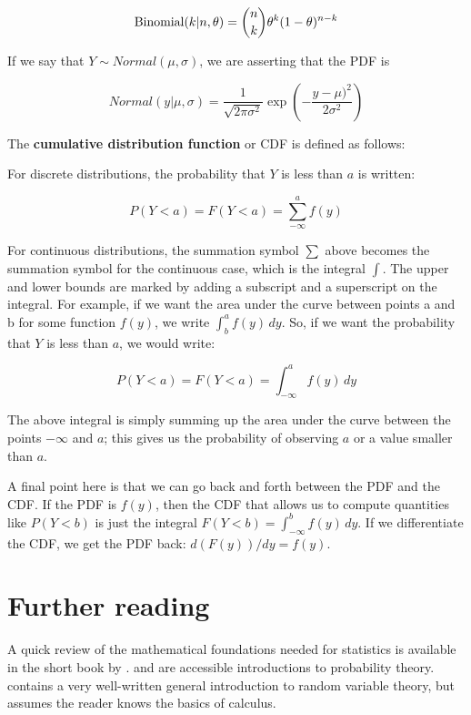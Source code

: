 \documentclass[12pt,]{krantz}
\begin{document}
\begin{equation}
\hbox{Binomial}(k|n,\theta) = 
\binom{n}{k} \theta^{k} (1-\theta)^{n-k}
\end{equation}

If we say that \(Y\sim Normal(\mu,\sigma)\), we are asserting that the PDF is

\begin{equation}
Normal(y|\mu,\sigma)= \frac{1}{\sqrt{2\pi \sigma^2}} \exp \left(-\frac{y-\mu)^2}{2\sigma^2} \right)
\end{equation}

The \textbf{cumulative distribution function} or CDF is defined as follows:

For discrete distributions, the probability that \(Y\) is less than \(a\) is written:

\begin{equation}
P(Y<a) = F(Y<a) =\sum_{-\infty}^{a} f(y)
\end{equation}

For continuous distributions, the summation symbol \(\sum\) above becomes the summation symbol for the continuous case, which is the integral \(\int\). The upper and lower bounds are marked by adding a subscript and a superscript on the integral. For example, if we want the area under the curve between points a and b for some function \(f(y)\), we write \(\int_b^a f(y)\, dy\). So, if we want the probability that \(Y\) is less than \(a\), we would write:

\begin{equation}
P(Y<a) = F(Y<a) =\int_{-\infty}^{a} f(y)\, dy
\end{equation}

The above integral is simply summing up the area under the curve between the points \(-\infty\) and \(a\); this gives us the probability of observing \(a\) or a value smaller than \(a\).

A final point here is that we can go back and forth between the PDF and the CDF. If the PDF is \(f(y)\), then the CDF that allows us to compute quantities like \(P(Y<b)\) is just the integral \(F(Y<b)=\int_{-\infty}^b f(y)\, dy\). If we differentiate the CDF, we get the PDF back: \(d(F(y))/dy=f(y)\).

\hypertarget{further-reading}{%
\section{Further reading}\label{further-reading}}

A quick review of the mathematical foundations needed for statistics is available in the short book by \citet{fox2009mathematical}. \citet{morin2016probability} and \citet{blitzstein2014introduction} are accessible introductions to probability theory. \citet{kerns} contains a very well-written general introduction to random variable theory, but assumes the reader knows the basics of calculus.
\end{document}
